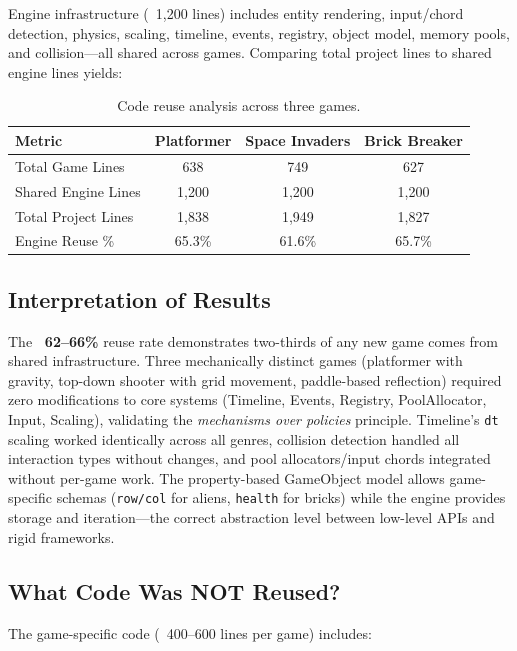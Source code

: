 \documentclass[12pt]{article}
\begin{document}
Engine infrastructure (~1,200 lines) includes entity rendering, input/chord detection, physics, scaling, timeline, events, registry, object model, memory pools, and collision—all shared across games. Comparing total project lines to shared engine lines yields:

\begin{table}[h]
\centering
\caption{Code reuse analysis across three games.}
\label{tab:reuse}
\begin{tabular}{@{}lccc@{}}
\toprule
Metric & Platformer & Space Invaders & Brick Breaker \\ \midrule
Total Game Lines & 638 & 749 & 627 \\
Shared Engine Lines & 1{,}200 & 1{,}200 & 1{,}200 \\
Total Project Lines & 1{,}838 & 1{,}949 & 1{,}827 \\
Engine Reuse \% & 65.3\% & 61.6\% & 65.7\% \\ \bottomrule
\end{tabular}
\end{table}

\subsection{Interpretation of Results}

The \textbf{~62--66\%} reuse rate demonstrates two-thirds of any new game comes from shared infrastructure. Three mechanically distinct games (platformer with gravity, top-down shooter with grid movement, paddle-based reflection) required zero modifications to core systems (Timeline, Events, Registry, PoolAllocator, Input, Scaling), validating the \emph{mechanisms over policies} principle. Timeline's \texttt{dt} scaling worked identically across all genres, collision detection handled all interaction types without changes, and pool allocators/input chords integrated without per-game work. The property-based GameObject model allows game-specific schemas (\texttt{row/col} for aliens, \texttt{health} for bricks) while the engine provides storage and iteration—the correct abstraction level between low-level APIs and rigid frameworks.

\subsection{What Code Was NOT Reused?}

The game-specific code (~400--600 lines per game) includes:
\end{document}
